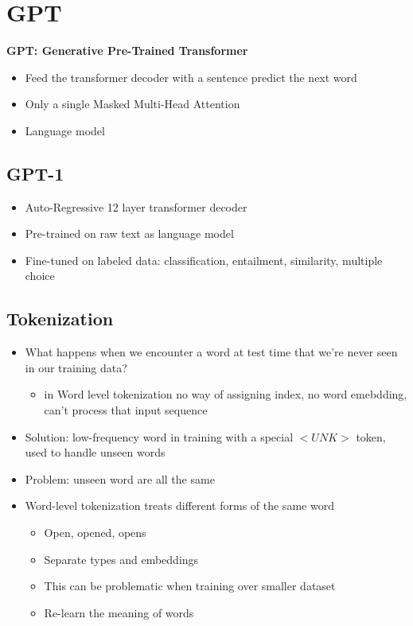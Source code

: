 \section{GPT}
\textbf{GPT: Generative Pre-Trained Transformer}
\begin{itemize}
    \item Feed the transformer decoder with a sentence predict the next word
    \item Only a single Masked Multi-Head Attention
    \item Language model
\end{itemize}
\subsection{GPT-1}
\begin{itemize}
    \item Auto-Regressive 12 layer transformer decoder
    \item Pre-trained on raw text as language model
    \item Fine-tuned on labeled data: classification, entailment, similarity, multiple choice
\end{itemize}
\subsection{Tokenization}
\begin{itemize}
    \item What happens when we encounter a word at test time that we're never seen in our training data?
    \begin{itemize}
        \item in Word level tokenization no way of assigning index, no word emebdding, can't process that input sequence
    \end{itemize}
    \item Solution: low-frequency word in training with a special \(<UNK>\) token, used to handle unseen words
    \item Problem: unseen word are all the same
    \item Word-level tokenization treats different forms of the same word
    \begin{itemize}
        \item Open, opened, opens
        \item Separate types and embeddings
        \item This can be problematic when training over smaller dataset
        \item Re-learn the meaning of words
    \end{itemize}
\end{itemize}
